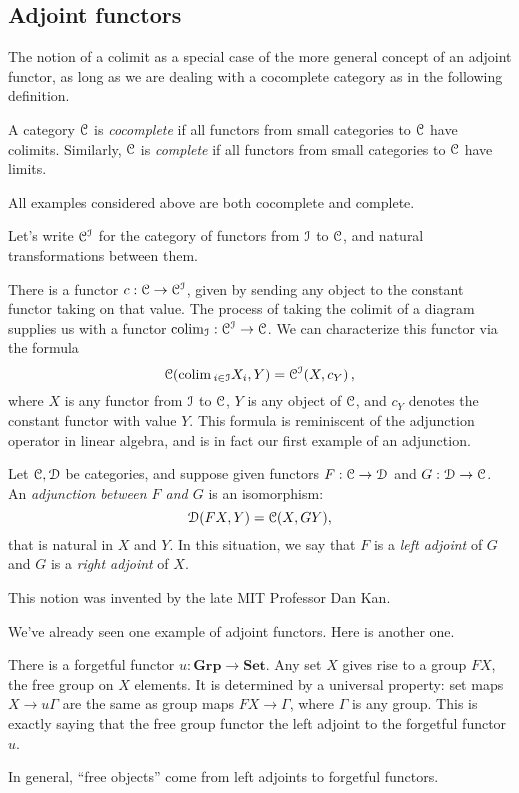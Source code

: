 \subsection{Adjoint functors}
The notion of a colimit as a special case of the more general concept of an 
adjoint functor, as long as we are dealing with a cocomplete category as in
the following definition.
\begin{definition}
    A category $\mathcal C$ is \emph{cocomplete} if all functors from small categories to $\mathcal C$ have colimits.
    Similarly,  $\mathcal C$ is \emph{complete} if all functors from small categories
to $\mathcal C$ have limits. 
\end{definition}
All examples considered above are both cocomplete and complete.

Let's write $\mathcal C^\mathcal I$ for the category of functors from $\mathcal I$ to $\mathcal C$,
and natural transformations between them.


There is a functor $c:\mathcal C\to \mathcal C^\mathcal I$, given by sending any object to the constant functor taking on that value.
The process of taking the colimit of a diagram supplies us with a functor 
$\operatorname{colim}_{\mathcal I}:\mathcal C^\mathcal I\to \mathcal C$.
We can characterize this functor via the formula
\[
\mathcal C(\operatorname{colim}{}_{i\in \mathcal I} X_i,Y) = \mathcal C^\mathcal I(X,c_Y)\,,
\]
where $X$ is any functor from $\mathcal I$ to $\mathcal C$, $Y$ is any object of $\mathcal C$,
and $c_Y$ denotes the constant functor with value $Y$.
This formula is reminiscent of the adjunction operator in linear algebra,
and is in fact our first example of an adjunction.

\begin{definition}
    Let $\mathcal C,\mathcal D$ be categories, and suppose given functors 
$F:\mathcal C\to \mathcal D$ and $G:\mathcal D\to\mathcal C$.
    An \emph{adjunction between $F$ and $G$} is an isomorphism:
    $$\mathcal D(FX,Y) = \mathcal C(X,GY),$$
    that is natural in $X$ and $Y$.
    In this situation, we say that $F$ is a \emph{left adjoint} of $G$ and $G$ is a \emph{right adjoint} of $X$.
\end{definition}
This notion was invented by the late MIT Professor Dan Kan.

We've already seen one example of adjoint functors. Here is another one.
\begin{definition}
    There is a forgetful functor $u:\mathbf{Grp}\to\mathbf{Set}$.
    Any set $X$ gives rise to a group $FX$, the free group on $X$ elements.
    It is determined by a universal property:
    set maps $X\to u\Gamma$ are the same as group maps $FX\to \Gamma$,
    where $\Gamma$ is any group.
    This is exactly saying that the free group functor the left adjoint to the forgetful functor $u$.
\end{definition}
In general, ``free objects'' come from left adjoints to forgetful functors.

